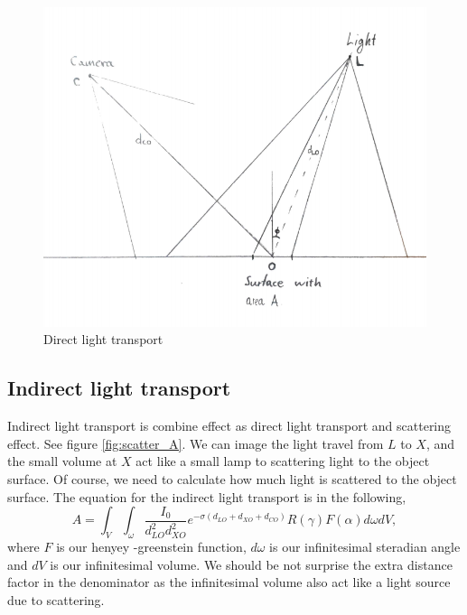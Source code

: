 \documentclass{article}
\begin{document}
\begin{figure}[h]
    \centering
    \includegraphics[width=\textwidth]{D.png}
    \caption{Direct light transport}
    \label{fig:scatter_D}
\end{figure}

\subsection{Indirect light transport}
Indirect light transport is combine effect as direct light transport and scattering effect. See figure \ref{fig:scatter_A}. We can image the light travel from $L$ to $X$, and the small volume at $X$ act like a small lamp to scattering light to the object surface. Of course, we need to calculate how much light is scattered to the object surface. The equation for the indirect light transport is in the following,
\begin{equation}
    A =  \int_V \int_\omega \frac{I_0}{d_{LO}^2 d_{XO}^2}e^{-\sigma(d_{LO}+d_{XO}+d_{CO})}R(\gamma)F(\alpha)d\omega dV,
    \label{eq:A}
\end{equation}
where $F$ is our henyey -greenstein function, $d\omega$ is our infinitesimal steradian angle and $dV$ is our infinitesimal volume. We should be not surprise the extra distance factor in the denominator as the infinitesimal volume also act like a light source due to scattering.
\end{document}
